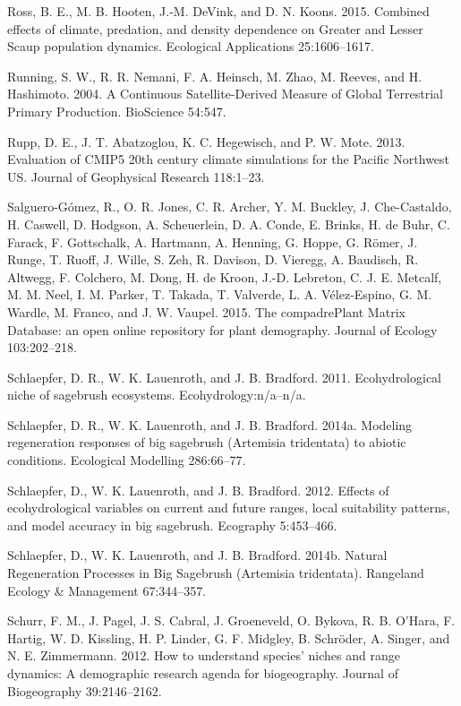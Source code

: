\documentclass[12pt,]{article}
\begin{document}
\hypertarget{ref-Ross2015}{}
Ross, B. E., M. B. Hooten, J.-M. DeVink, and D. N. Koons. 2015. Combined
effects of climate, predation, and density dependence on Greater and
Lesser Scaup population dynamics. Ecological Applications 25:1606--1617.

\hypertarget{ref-Running2004}{}
Running, S. W., R. R. Nemani, F. A. Heinsch, M. Zhao, M. Reeves, and H.
Hashimoto. 2004. A Continuous Satellite-Derived Measure of Global
Terrestrial Primary Production. BioScience 54:547.

\hypertarget{ref-Rupp2013}{}
Rupp, D. E., J. T. Abatzoglou, K. C. Hegewisch, and P. W. Mote. 2013.
Evaluation of CMIP5 20th century climate simulations for the Pacific
Northwest US. Journal of Geophysical Research 118:1--23.

\hypertarget{ref-Salguero-Gomez2015}{}
Salguero-Gómez, R., O. R. Jones, C. R. Archer, Y. M. Buckley, J.
Che-Castaldo, H. Caswell, D. Hodgson, A. Scheuerlein, D. A. Conde, E.
Brinks, H. de Buhr, C. Farack, F. Gottschalk, A. Hartmann, A. Henning,
G. Hoppe, G. Römer, J. Runge, T. Ruoff, J. Wille, S. Zeh, R. Davison, D.
Vieregg, A. Baudisch, R. Altwegg, F. Colchero, M. Dong, H. de Kroon,
J.-D. Lebreton, C. J. E. Metcalf, M. M. Neel, I. M. Parker, T. Takada,
T. Valverde, L. A. Vélez-Espino, G. M. Wardle, M. Franco, and J. W.
Vaupel. 2015. The compadrePlant Matrix Database: an open online
repository for plant demography. Journal of Ecology 103:202--218.

\hypertarget{ref-Schlaepfer2011}{}
Schlaepfer, D. R., W. K. Lauenroth, and J. B. Bradford. 2011.
Ecohydrological niche of sagebrush ecosystems. Ecohydrology:n/a--n/a.

\hypertarget{ref-Schlaepfer2014}{}
Schlaepfer, D. R., W. K. Lauenroth, and J. B. Bradford. 2014a. Modeling
regeneration responses of big sagebrush (Artemisia tridentata) to
abiotic conditions. Ecological Modelling 286:66--77.

\hypertarget{ref-Schlaepfer2012}{}
Schlaepfer, D., W. K. Lauenroth, and J. B. Bradford. 2012. Effects of
ecohydrological variables on current and future ranges, local
suitability patterns, and model accuracy in big sagebrush. Ecography
5:453--466.

\hypertarget{ref-Schlaepfer2014a}{}
Schlaepfer, D., W. K. Lauenroth, and J. B. Bradford. 2014b. Natural
Regeneration Processes in Big Sagebrush (Artemisia tridentata).
Rangeland Ecology \& Management 67:344--357.

\hypertarget{ref-Schurr2012a}{}
Schurr, F. M., J. Pagel, J. S. Cabral, J. Groeneveld, O. Bykova, R. B.
O'Hara, F. Hartig, W. D. Kissling, H. P. Linder, G. F. Midgley, B.
Schröder, A. Singer, and N. E. Zimmermann. 2012. How to understand
species' niches and range dynamics: A demographic research agenda for
biogeography. Journal of Biogeography 39:2146--2162.
\end{document}
